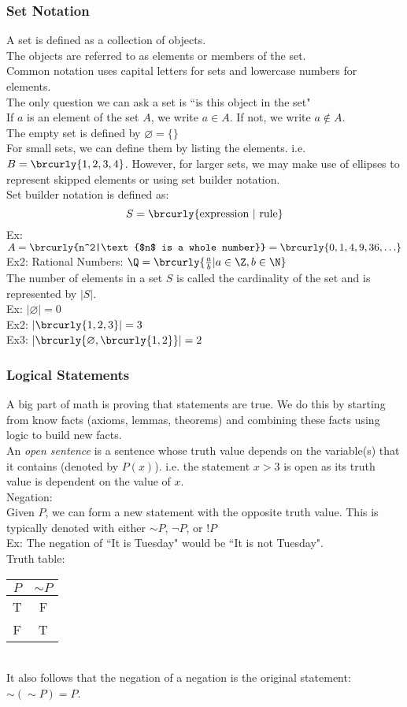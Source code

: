 \subsubsection{Set Notation}
A set is defined as a collection of objects.\\
The objects are referred to as elements or members of the set.\\
Common notation uses capital letters for sets and lowercase numbers for elements.\\
The only question we can ask a set is ``is this object in the set"\\
If $a$ is an element of the set $A$, we write $a\in A$. If not, we write $a\notin A$.\\
The empty set is defined by $\varnothing=\{\}$\\
For small sets, we can define them by listing the elements. i.e. $B=\brcurly{1,2,3,4}$. However, for larger sets, we may make use of ellipses to represent skipped elements or using set builder notation.\\
Set builder notation is defined as:
$$S=\brcurly{\text{expression }|\text{ rule}}$$
Ex: $A=\brcurly{n^2|\text{$n$ is a whole number}}=\brcurly{0,1,4,9,36,\ldots}$\\
Ex2: Rational Numbers: $\Q=\brcurly{\frac{a}{b}|a\in\Z,b\in\N}$\\
The number of elements in a set $S$ is called the cardinality of the set and is represented by $|S|$.\\
Ex: $|\varnothing|=0$\\
Ex2: $|\brcurly{1,2,3}|=3$\\
Ex3: $|\brcurly{\varnothing,\brcurly{1,2}}|=2$\\
\subsubsection{Logical Statements}
A big part of math is proving that statements are true. We do this by starting from know facts (axioms, lemmas, theorems) and combining these facts using logic to build new facts.\\

An \textit{open sentence} is a sentence whose truth value depends on the variable(s) that it contains (denoted by $P(x)$). i.e. the statement $x>3$ is open as its truth value is dependent on the value of $x$.\\

Negation:\\
Given $P$, we can form a new statement with the opposite truth value. This is typically denoted with either $\sim P$, $\neg P$, or $!P$\\
Ex: The negation of ``It is Tuesday" would be ``It is not Tuesday".\\
Truth table:\\
\begin{tabular}{c|c}
$P$ & $\sim P$\\
\hline
T & F\\
F & T
\end{tabular}\\
It also follows that the negation of a negation is the original statement: $\sim(\sim P)=P$.\\

